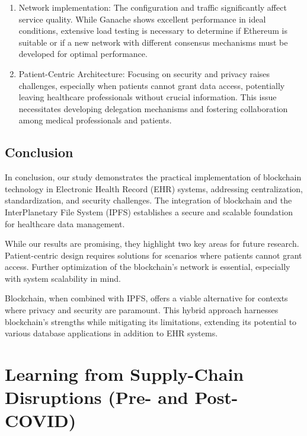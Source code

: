 \documentclass[12pt]{report}
\begin{document}
\begin{enumerate}
    \item Network implementation: The configuration and traffic significantly affect service quality. While Ganache shows excellent performance in ideal conditions, extensive load testing is necessary to determine if Ethereum is suitable or if a new network with different consensus mechanisms must be developed for optimal performance.
    
    \item Patient-Centric Architecture: Focusing on security and privacy raises challenges, especially when patients cannot grant data access, potentially leaving healthcare professionals without crucial information. This issue necessitates developing delegation mechanisms and fostering collaboration among medical professionals and patients.
\end{enumerate}


\section{Conclusion}

In conclusion, our study demonstrates the practical implementation of blockchain technology in Electronic Health Record (EHR) systems, addressing centralization, standardization, and security challenges. The integration of blockchain and the InterPlanetary File System (IPFS) establishes a secure and scalable foundation for healthcare data management.

While our results are promising, they highlight two key areas for future research. Patient-centric design requires solutions for scenarios where patients cannot grant access. Further optimization of the blockchain's network is essential, especially with system scalability in mind.

Blockchain, when combined with IPFS, offers a viable alternative for contexts where privacy and security are paramount. This hybrid approach harnesses blockchain's strengths while mitigating its limitations, extending its potential to various database applications in addition to EHR systems.

\chapter[Learning from Supply-Chain Disruptions (Pre- and Post-COVID)]{Learning from Supply-Chain Disruptions (Pre- and Post-COVID)}\label{chap:supplychain}
\end{document}
